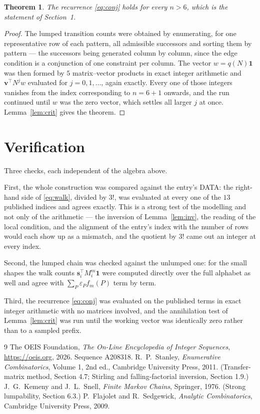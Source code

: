 \documentclass[11pt,a4paper]{article}
\theoremstyle{plain}
\newtheorem{theorem}{Theorem}
\theoremstyle{definition}
\begin{document}
\begin{theorem}
The recurrence \eqref{eq:conj} holds for every $n>6$, which is the statement of
Section~1.
\end{theorem}

\begin{proof}
The lumped transition counts were obtained by enumerating, for one representative row of
each pattern, all admissible successors and sorting them by pattern --- the successors being
generated column by column, since the edge condition is a conjunction of one constraint per
column. The vector $w=q(N)\mathbf{1}$ was then formed by $5$ matrix--vector products
in exact integer arithmetic and $\mathbf{v}^{\!\top}N^{j}w$ evaluated for
$j=0,1,\dots$, again exactly. Every one of those integers vanishes from the index
corresponding to $n=6+1$ onwards, and the run continued until $w$ was the zero vector,
which settles all larger $j$ at once. Lemma~\ref{lem:crit} gives the theorem.
\end{proof}

\section{Verification}

Three checks, each independent of the algebra above.

First, the whole construction was compared against the entry's DATA: the right-hand side of
\eqref{eq:walk}, divided by $3!$, was evaluated at every one of the $13$
published indices and agrees exactly. This is a strong test of the modelling and not only of
the arithmetic --- the inversion of Lemma~\ref{lem:inv}, the reading of the local
condition, and the alignment of the entry's index with the number of rows would each
show up as a mismatch, and the quotient by $3!$ came out an integer at every index.

Second, the lumped chain was checked against the unlumped one: for the small shapes the walk
counts $\mathbf{s}_i^{\!\top}M_i^{m}\mathbf{1}$ were computed directly over the full
alphabet as well and agree with $\sum_P\varepsilon_Pf_m(P)$ term by term.

Third, the recurrence \eqref{eq:conj} was evaluated on the published terms in exact integer
arithmetic with no matrices involved, and the annihilation test of Lemma~\ref{lem:crit} was
run until the working vector was identically zero rather than to a sampled prefix.

\begin{thebibliography}{9}
 The OEIS Foundation, \emph{The On-Line Encyclopedia of Integer
Sequences}, \url{https://oeis.org}, 2026. Sequence A208318.
 R.~P.~Stanley, \emph{Enumerative Combinatorics}, Volume 1, 2nd ed.,
Cambridge University Press, 2011. (Transfer-matrix method, Section 4.7; Stirling and
falling-factorial inversion, Section 1.9.)
 J.~G.~Kemeny and J.~L.~Snell, \emph{Finite Markov Chains}, Springer,
1976. (Strong lumpability, Section 6.3.)
 P.~Flajolet and R.~Sedgewick, \emph{Analytic Combinatorics}, Cambridge
University Press, 2009.
\end{thebibliography}
\end{document}
